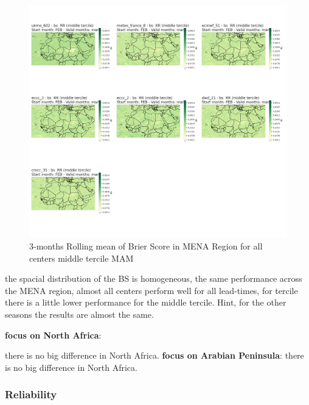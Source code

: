 \begin{figure}[H]
\includegraphics[scale=0.3]{plots/prob/bs/bs_mam_RR_middle.png}
\caption{3-months Rolling mean of Brier Score in MENA Region for all centers middle tercile MAM}
\end{figure}

the spacial distribution of the BS is homogeneous, the same performance across the MENA region, almost all centers perform well for all lead-times, for  tercile there is a little lower performance for the middle tercile.
Hint, for the other seasons the results are almost the same. 

\vspace{1.5cm}
\textbf{focus on North Africa}:

there is no big difference in North Africa.
\vspace{1.5cm}
\textbf{focus on Arabian Peninsula}:
there is no big difference in North Africa.

\subsubsection{Reliability}

